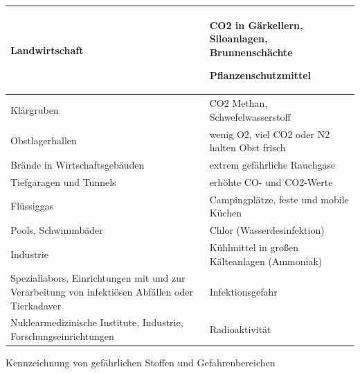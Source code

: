\documentclass{article}
\begin{document}
\begin{flushleft}
\tablehead{}\begin{supertabular}{|m{6.393cm}m{6.9030004cm}|}
\hline
{\mdseries Landwirtschaft}

 &
{\mdseries CO2 in G\"arkellern, Siloanlagen, Brunnensch\"achte}

{\mdseries Pflanzenschutzmittel}

\\\hline
{\mdseries Kl\"argruben}

 &
{\mdseries CO2 Methan, Schwefelwasserstoff}

\\\hline
{\mdseries Obstlagerhallen}

 &
{\mdseries wenig O2, viel CO2 oder N2 halten Obst frisch}

\\\hline
{\mdseries Br\"ande in Wirtschaftsgeb\"auden}

 &
{\mdseries extrem gef\"ahrliche Rauchgase}

\\\hline
{\mdseries Tiefgaragen und Tunnels}

 &
{\mdseries erh\"ohte CO- und CO2-Werte}

\\\hline
{\mdseries Fl\"ussiggas}

 &
{\mdseries Campingpl\"atze, feste und mobile K\"uchen}

\\\hline
{\mdseries Pools, Schwimmb\"ader}

 &
{\mdseries Chlor (Wasserdesinfektion)}

\\\hline
{\mdseries Industrie}

 &
{\mdseries K\"uhlmittel in gro{\ss}en K\"alteanlagen (Ammoniak)}

\\\hline
{\mdseries Speziallabors, Einrichtungen mit und zur Verarbeitung von
infekti\"osen Abf\"allen oder Tierkadaver}

 &
{\mdseries Infektionsgefahr}

\\\hline
{\mdseries Nuklearmedizinische Institute, Industrie,
Forschungseinrichtungen}

 &
{\mdseries Radioaktivit\"at}

\\\hline
\end{supertabular}
\end{flushleft}
{\mdseries\color[rgb]{0.0,0.0,0.5019608}
Kennzeichnung von gef\"ahrlichen Stoffen und Gefahrenbereichen}
\end{document}
